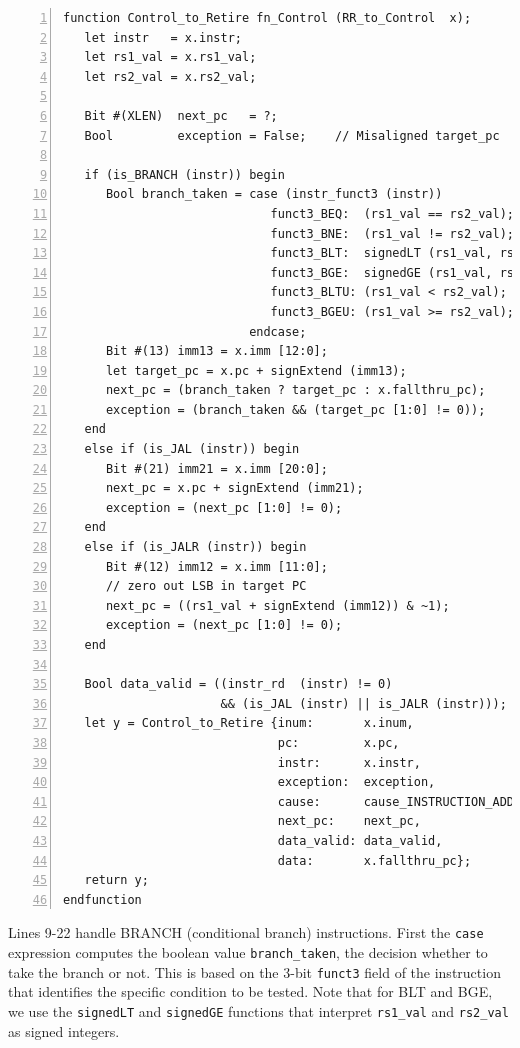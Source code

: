 {\small
\begin{Verbatim}[frame=single, numbers=left]
function Control_to_Retire fn_Control (RR_to_Control  x);
   let instr   = x.instr;
   let rs1_val = x.rs1_val;
   let rs2_val = x.rs2_val;

   Bit #(XLEN)  next_pc   = ?;
   Bool         exception = False;    // Misaligned target_pc

   if (is_BRANCH (instr)) begin
      Bool branch_taken = case (instr_funct3 (instr))
                             funct3_BEQ:  (rs1_val == rs2_val);
                             funct3_BNE:  (rs1_val != rs2_val);
                             funct3_BLT:  signedLT (rs1_val, rs2_val);
                             funct3_BGE:  signedGE (rs1_val, rs2_val);
                             funct3_BLTU: (rs1_val < rs2_val);
                             funct3_BGEU: (rs1_val >= rs2_val);
                          endcase;
      Bit #(13) imm13 = x.imm [12:0];
      let target_pc = x.pc + signExtend (imm13);
      next_pc = (branch_taken ? target_pc : x.fallthru_pc);
      exception = (branch_taken && (target_pc [1:0] != 0));
   end
   else if (is_JAL (instr)) begin
      Bit #(21) imm21 = x.imm [20:0];
      next_pc = x.pc + signExtend (imm21);
      exception = (next_pc [1:0] != 0);
   end
   else if (is_JALR (instr)) begin
      Bit #(12) imm12 = x.imm [11:0];
      // zero out LSB in target PC
      next_pc = ((rs1_val + signExtend (imm12)) & ~1);
      exception = (next_pc [1:0] != 0);
   end

   Bool data_valid = ((instr_rd  (instr) != 0)
                      && (is_JAL (instr) || is_JALR (instr)));
   let y = Control_to_Retire {inum:       x.inum,
                              pc:         x.pc,
                              instr:      x.instr,
                              exception:  exception,
                              cause:      cause_INSTRUCTION_ADDRESS_MISALIGNED,
                              next_pc:    next_pc,
                              data_valid: data_valid,
                              data:       x.fallthru_pc};
   return y;
endfunction
\end{Verbatim}
}

Lines 9-22 handle BRANCH (conditional branch) instructions.  First the
\verb|case| expression computes the boolean value \verb|branch_taken|,
the decision whether to take the branch or not.  This is based on the
3-bit \verb|funct3| field of the instruction that identifies the
specific condition to be tested.  Note that for BLT and BGE, we use
the \verb|signedLT| and \verb|signedGE| functions that interpret
\verb|rs1_val| and \verb|rs2_val| as signed integers.

